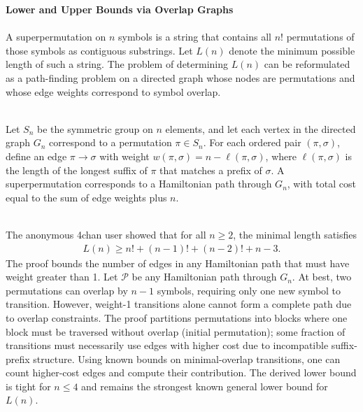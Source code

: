 \begin{technical}
{\Large\textbf{Lower and Upper Bounds via Overlap Graphs}}\\

\\
A superpermutation on $n$ symbols is a string that contains all $n!$ permutations of those symbols as contiguous substrings. Let $L(n)$ denote the minimum possible length of such a string. The problem of determining $L(n)$ can be reformulated as a path-finding problem on a directed graph whose nodes are permutations and whose edge weights correspond to symbol overlap.

\\
Let $S_n$ be the symmetric group on $n$ elements, and let each vertex in the directed graph $G_n$ correspond to a permutation $\pi \in S_n$. For each ordered pair $(\pi, \sigma)$, define an edge $\pi \rightarrow \sigma$ with weight $w(\pi, \sigma) = n - \ell(\pi, \sigma)$, where $\ell(\pi, \sigma)$ is the length of the longest suffix of $\pi$ that matches a prefix of $\sigma$. A superpermutation corresponds to a Hamiltonian path through $G_n$, with total cost equal to the sum of edge weights plus $n$.

\\
The anonymous 4chan user showed that for all $n \geq 2$, the minimal length satisfies
\begin{align*}
L(n) \geq n! + (n-1)! + (n-2)! + n - 3.
\end{align*}
The proof bounds the number of edges in any Hamiltonian path that must have weight greater than 1. Let $\mathcal{P}$ be any Hamiltonian path through $G_n$. At best, two permutations can overlap by $n-1$ symbols, requiring only one new symbol to transition. However, weight-1 transitions alone cannot form a complete path due to overlap constraints. The proof partitions permutations into blocks where one block must be traversed without overlap (initial permutation); some fraction of transitions must necessarily use edges with higher cost due to incompatible suffix-prefix structure. Using known bounds on minimal-overlap transitions, one can count higher-cost edges and compute their contribution.
The derived lower bound is tight for $n\le 4$ and remains the strongest known general lower bound for $L(n)$.


\end{technical}
